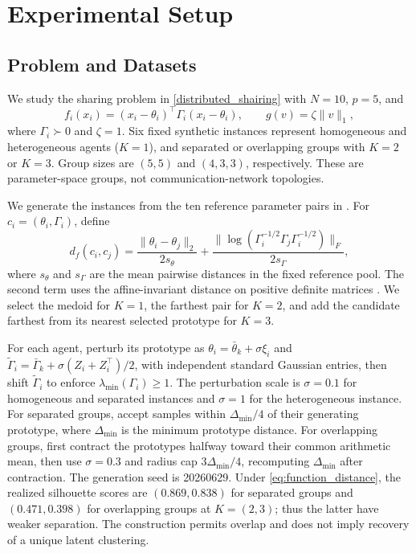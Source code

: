 \section{Experimental Setup}
\label{sec:data_generate}
\label{sec:experimental_setup}

\subsection{Problem and Datasets}
We study the sharing problem in \eqref{distributed_shairing} with $N=10$, $p=5$, and
\begin{equation}
 f_i(x_i)=(x_i-\theta_i)^\top\Gamma_i(x_i-\theta_i),
 \qquad g(v)=\zeta\|v\|_1,
 \label{eq:quadratic_form}
\end{equation}
where $\Gamma_i\succ0$ and $\zeta=1$. Six fixed synthetic instances represent homogeneous and heterogeneous agents ($K=1$), and separated or overlapping groups with $K=2$ or $K=3$. Group sizes are $(5,5)$ and $(4,3,3)$, respectively. These are parameter-space groups, not communication-network topologies.

We generate the instances from the ten reference parameter pairs in \cite{duarte2024communication}. For $c_i=(\theta_i,\Gamma_i)$, define
\begin{equation}
 d_f(c_i,c_j)=\frac{\|\theta_i-\theta_j\|_2}{2s_\theta}
 +\frac{\|\log(\Gamma_i^{-1/2}\Gamma_j\Gamma_i^{-1/2})\|_F}{2s_\Gamma},
 \label{eq:function_distance}
\end{equation}
where $s_\theta$ and $s_\Gamma$ are the mean pairwise distances in the fixed reference pool. The second term uses the affine-invariant distance on positive definite matrices \cite{pennec2006riemannian}. We select the medoid for $K=1$, the farthest pair for $K=2$, and add the candidate farthest from its nearest selected prototype for $K=3$.

For each agent, perturb its prototype as $\theta_i=\bar\theta_k+\sigma\xi_i$ and $\widetilde\Gamma_i=\bar\Gamma_k+\sigma(Z_i+Z_i^\top)/2$, with independent standard Gaussian entries, then shift $\widetilde\Gamma_i$ to enforce $\lambda_{\min}(\Gamma_i)\geq1$. The perturbation scale is $\sigma=0.1$ for homogeneous and separated instances and $\sigma=1$ for the heterogeneous instance. For separated groups, accept samples within $\Delta_{\min}/4$ of their generating prototype, where $\Delta_{\min}$ is the minimum prototype distance. For overlapping groups, first contract the prototypes halfway toward their common arithmetic mean, then use $\sigma=0.3$ and radius cap $3\Delta_{\min}/4$, recomputing $\Delta_{\min}$ after contraction. The generation seed is 20260629. Under \eqref{eq:function_distance}, the realized silhouette scores are $(0.869,0.838)$ for separated groups and $(0.471,0.398)$ for overlapping groups at $K=(2,3)$; thus the latter have weaker separation. The construction permits overlap and does not imply recovery of a unique latent clustering.

